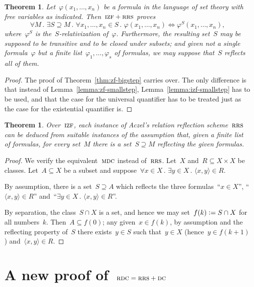 \documentclass[oneside,reqno]{amsart}
\theoremstyle{definition}
\theoremstyle{plain}
\newtheorem{thm}[defn]{Theorem}
\theoremstyle{remark}
\newcommand{\defeq}{\vcentcolon=}
\renewcommand{\_}{\mathpunct{.}\,}
\newcommand{\?}{\,{:}\,}
\newcommand{\IZF}{\textsc{izf}}
\newcommand{\RRS}{\textsc{rrs}}
\newcommand{\RDC}{\textsc{rdc}}
\newcommand{\DC}{\textsc{dc}}
\newcommand{\MDC}{\textsc{mdc}}
\begin{document}
\begin{thm}\label{thm:izf-bigstep}
Let~$\varphi(x_1,\ldots,x_n)$ be a formula in the language of set
theory with free variables as indicated. Then~$\IZF+\RRS$ proves
\[ \forall M\_
  \exists S \supseteq M\_
  \forall x_1,\ldots,x_n \in S\_
  \varphi(x_1,\ldots,x_n) \Leftrightarrow \varphi^S(x_1,\ldots,x_n), \]
where~$\varphi^S$ is the~$S$-relativization of~$\varphi$.
Furthermore, the resulting set~$S$ may be supposed to be transitive and to be closed
under subsets; and given not a single formula~$\varphi$ but a finite
list~$\varphi_1,\ldots,\varphi_s$ of formulas, we may suppose that~$S$ reflects
all of them.
\end{thm}

\begin{proof}The proof of Theorem~\ref{thm:zf-bigstep} carries over. The only
difference is that instead of Lemma~\ref{lemma:zf-smallstep},
Lemma~\ref{lemma:izf-smallstep} has to be used, and that the case for the
universal quantifier has to be treated just as the case for the existential
quantifier is.\end{proof}

\begin{thm}\label{thm:refl-entails-rrs}
Over~$\IZF$, each instance of Aczel's relation reflection scheme~$\RRS$ can be
deduced from suitable instances of the assumption that, given a finite list
of formulas, for every set~$M$ there is a set~$S \supseteq M$ reflecting the
given formulas.
\end{thm}

\begin{proof}We verify the equivalent~$\MDC$ instead of~$\RRS$. Let~$X$ and~$R
\subseteq X \times X$ be classes. Let~$A \subseteq X$ be a subset and
suppose~$\forall x \in X\_ \exists y \in X\_ \langle x,y \rangle \in R$.

By assumption, there is a set~$S \supseteq A$ which reflects the three
formulas~``$x \in X$'', ``$\langle x,y \rangle \in R$'' and~``$\exists y \in X\_ \langle
x,y \rangle \in R$''.

By separation, the class~$S \cap X$ is a set, and hence we may set~$f(k) \defeq S \cap X$
for all numbers~$k$. Then~$A \subseteq f(0)$; any given~$x \in f(k)$, by
assumption and the reflecting property of~$S$ there exists~$y \in S$ such
that~$y \in X$ (hence~$y \in f(k+1)$) and~$\langle x,y \rangle \in R$.
\end{proof}


\section{A new proof of~$\RDC = \RRS + \DC$}
\label{sect:appl-rdc}
\end{document}
